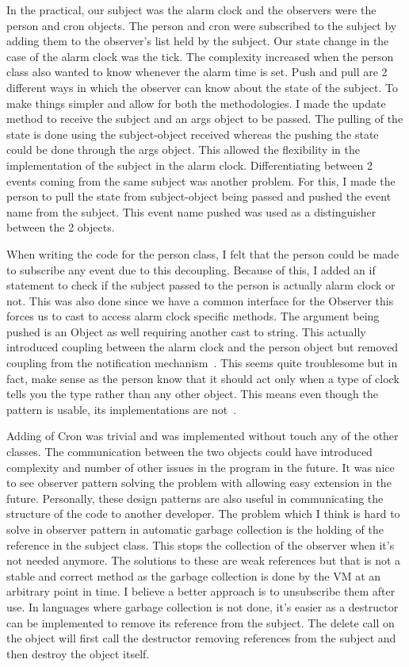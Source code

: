 In the practical, our subject was the alarm clock and the observers were the person and cron objects. The person and cron were subscribed to the subject by adding them to the observer's list held by the subject. Our state change in the case of the alarm clock was the tick. The complexity increased when the person class also wanted to know whenever the alarm time is set. Push and pull are 2 different ways in which the observer can know about the state of the subject. To make things simpler and allow for both the methodologies. I made the update method to receive the subject and an args object to be passed. The pulling of the state is done using the subject-object received whereas the pushing the state could be done through the args object. This allowed the flexibility in the implementation of the subject in the alarm clock. Differentiating between 2 events coming from the same subject was another problem. For this, I made the person to pull the state from subject-object being passed and pushed the event name from the subject. This event name pushed was used as a distinguisher between the 2 objects. 

When writing the code for the person class, I felt that the person could be made to subscribe any event due to this decoupling. Because of this, I added an if statement to check if the subject passed to the person is actually alarm clock or not. This was also done since we have a common interface for the Observer this forces us to cast to access alarm clock specific methods. The argument being pushed is an Object as well requiring another cast to string. This actually introduced coupling between the alarm clock and the person object but removed coupling from the notification mechanism~\cite{hannemann2002design}. This seems quite troublesome but in fact, make sense as the person know that it should act only when a type of clock tells you the type rather than any other object. This means even though the pattern is usable, its implementations are not~\cite{hannemann2002design}.

Adding of Cron was trivial and was implemented without touch any of the other classes. The communication between the two objects could have introduced complexity and number of other issues in the program in the future. It was nice to see observer pattern solving the problem with allowing easy extension in the future. Personally, these design patterns are also useful in communicating the structure of the code to another developer. The problem which I think is hard to solve in observer pattern in automatic garbage collection is the holding of the reference in the subject class. This stops the collection of the observer when it's not needed anymore. The solutions to these are weak references but that is not a stable and correct method as the garbage collection is done by the VM at an arbitrary point in time. I believe a better approach is to unsubscribe them after use. In languages where garbage collection is not done, it's easier as a destructor can be implemented to remove its reference from the subject. The delete call on the object will first call the destructor removing references from the subject and then destroy the object itself.

